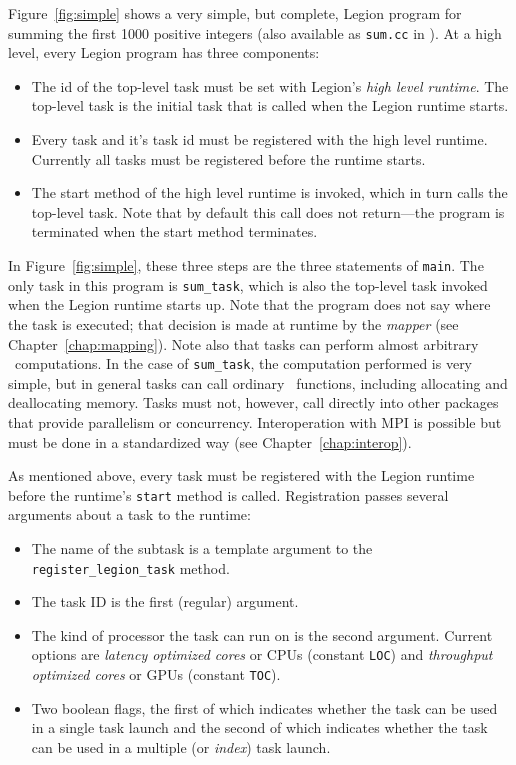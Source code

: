 Figure~\ref{fig:simple} shows a very simple, but complete, Legion program for summing
the first 1000 positive integers (also available as {\tt sum.cc} in ).  
At a high level, every Legion program has three components:
\begin{itemize}
\item The id of the top-level task must be set with Legion's {\em high level runtime}.  The top-level
task is the initial task that is called when the Legion runtime starts.
\item Every task and it's task id must be registered with the high level runtime.  Currently all tasks
must be registered before the runtime starts.
\item The start method of the high level runtime is invoked, which in turn calls the top-level task.
Note that by default this call does not return---the program is terminated when the start method terminates.
\end{itemize}
In Figure~\ref{fig:simple}, these three steps are the three statements of {\tt main}.  
The only task in this program is {\tt sum\_task}, which is also the top-level task invoked when the
Legion runtime starts up.  Note that the program does not say where the task is executed; that decision is made
at runtime by the {\em mapper} (see Chapter~\ref{chap:mapping}).  Note also that tasks can perform almost arbitrary
\Cpp\ computations.  In the case of {\tt sum\_task}, the computation performed is very simple, but in general tasks
can call ordinary \Cpp\ functions, including allocating and deallocating memory.  Tasks must not, however,
call directly into other packages that provide parallelism or concurrency.  Interoperation with MPI is
possible but must be done in a standardized way (see Chapter~\ref{chap:interop}).  

As mentioned above, every task must be registered with the Legion runtime before
the runtime's {\tt start} method is called.  Registration passes several arguments about a
task to the runtime:
\begin{itemize}
\item The name of the subtask is a template argument to the {\tt register\_legion\_task} method.

\item The task ID is the first (regular) argument.

\item The kind of processor the task can run on is the second argument.  Current options are
{\em latency optimized cores} or CPUs (constant {\tt LOC}) and {\em throughput optimized cores} or GPUs
(constant {\tt TOC}).

\item Two boolean flags, the first of which indicates whether the task can be used in a single task
launch and the second of which indicates whether the task can be used in a multiple (or {\em index}) task
launch.
\end{itemize}

